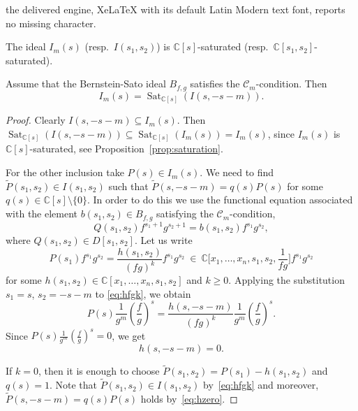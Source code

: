 \documentclass[10pt,a4paper]{amsart}
\DeclareMathOperator{\Sat}{Sat}
\def\CC{\mathbb{C}}
\begin{document}
the delivered engine, XeLaTeX with its default Latin Modern text font, reports no missing character.
\begin{prop}\label{prop:saturation}
The ideal $I_m(s)$ (resp.~$I(s_1,s_2)$) is $\CC[s]$-saturated (resp.~$\CC[s_1,s_2]$-saturated).
\end{prop}

\begin{theorem}\label{thm:main-theorem}
Assume that the Bernstein-Sato ideal $B_{f,g}$ satisfies the $\mathcal{C}_m$-condition.
Then
\[
I_m(s) = \Sat_{\CC[s]}(I(s,-s-m)).
\]
\end{theorem}

\begin{proof}
Clearly $I(s,-s-m) \subseteq I_m(s)$. Then $\Sat_{\CC[s]}(I(s,-s-m)) \subseteq \Sat_{\CC[s]}(I_m(s)) = I_m(s)$,
since $I_m(s)$ is $\CC[s]$-saturated, see Proposition~\ref{prop:saturation}.

For the other inclusion take $P(s) \in I_m(s)$.
We need to find $\tilde{P}(s_1,s_2) \in I(s_1,s_2)$ such that $\tilde{P}(s,-s-m) = q(s) P(s)$ for some
$q(s) \in \CC[s] \setminus \{0\}$.
In order to do this we use the functional equation associated with the element $b(s_1,s_2) \in B_{f,g}$
satisfying the $\mathcal{C}_m$-condition,
\begin{equation}\label{eq:BSfg}
Q(s_1,s_2) f^{s_1+1} g^{s_2+1} = b(s_1,s_2) f^{s_1} g^{s_2},
\end{equation}
where $Q(s_1,s_2) \in D[s_1,s_2]$. Let us write
\begin{equation}\label{eq:hfgk}
P(s_1) f^{s_1} g^{s_2}
= \frac{h(s_1,s_2)}{(fg)^k} f^{s_1} g^{s_2}
\ \in \ \CC \Big[ x_1,\ldots,x_n,s_1,s_2,\frac{1}{fg} \Big] f^{s_1} g^{s_2}
\end{equation}
for some $h(s_1,s_2) \in \CC[x_1,\ldots,x_n,s_1,s_2]$ and $k \geq 0$.
Applying the substitution $s_1 = s$, $s_2=-s-m$ to \eqref{eq:hfgk}, we obtain
\[
P(s) \frac{1}{g^m} \left( \frac{f}{g} \right)^s
= \frac{h(s,-s-m)}{(fg)^k} \frac{1}{g^m} \left( \frac{f}{g} \right)^s.
\]
Since $P(s) \frac{1}{g^m} \left( \frac{f}{g} \right)^s = 0$,
we get
\begin{equation}\label{eq:hzero}
h(s,-s-m) = 0.
\end{equation}

If $k = 0$, then it is enough to choose $\tilde{P}(s_1,s_2) = P(s_1) - h(s_1,s_2)$ and $q(s)=1$.
Note that $\tilde{P}(s_1,s_2) \in I(s_1,s_2)$ by~\eqref{eq:hfgk} and moreover, $\tilde{P}(s,-s-m) = q(s) P(s)$ holds by~\eqref{eq:hzero}.


\end{proof}
\end{document}
